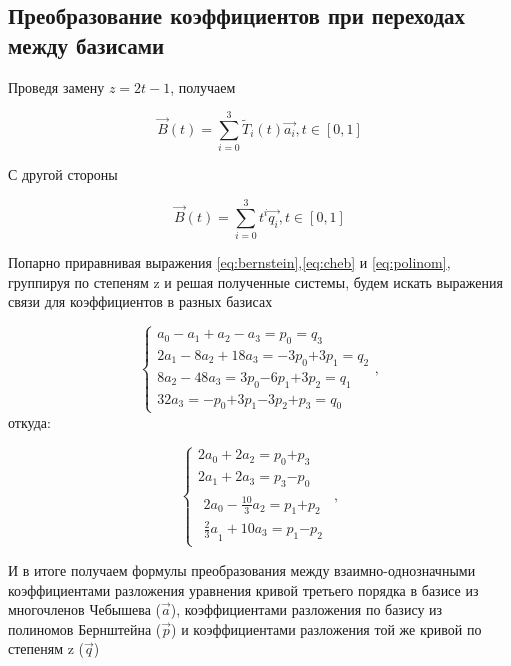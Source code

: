 \documentclass[a4paper,12pt]{report}
\begin{document}
\subsection{Преобразование коэффициентов при переходах между базисами}

Проведя замену  $z=2t-1$, получаем 

\[\overrightarrow{B}\left(t\right)=\sum^3_{i=0}{{\tilde{T}}_i(t)\overrightarrow{a_i}},      t\in [0,1]\] 

С другой стороны 

\begin{equation} \label{eq:polinom} 
\overrightarrow{B}\left(t\right)=\sum^3_{i=0}{t^i\overrightarrow{q_i}},      t\in [0,1] 
\end{equation} 

Попарно приравнивая выражения \ref{eq:bernstein},\ref{eq:cheb} и \ref{eq:polinom}, группируя по степеням z и решая полученные системы, будем искать выражения связи для  коэффициентов в разных базисах

\[\left\{ \begin{array}{c}
a_0-a_1+a_2-a_3=p_0=q_3 \\ 
2a_1-8a_2+18a_3={-3p}_0{+3p}_1=q_2 \\ 
8a_2-48a_3={3p}_0{-6p}_1{+3p}_2=q_1 \\ 
32a_3={-p}_0{+3p}_1{-3p}_2{+p}_3=q_0 \end{array}
\right.,\] 
откуда:

\[\left\{ \begin{array}{c}
2a_0+2a_2=p_0{+p}_3 \\ 
2a_1+2a_3=p_3{-p}_0 \\ 
 \begin{array}{c}
2a_0-\frac{10}{3}a_2=p_1{+p}_2 \\ 
{\frac{2}{3}a}_1+10a_3=p_1{-p}_2 \end{array}
 \end{array}
\right.,\] 

И в итоге получаем формулы преобразования между взаимно-однозначными коэффициентами разложения уравнения кривой третьего порядка в базисе из многочленов Чебышева ($\overrightarrow{a}$), коэффициентами разложения по базису из полиномов Бернштейна ($\overrightarrow{p}$) и коэффициентами разложения той же кривой по степеням z  ($\overrightarrow{q}$)
\end{document}
